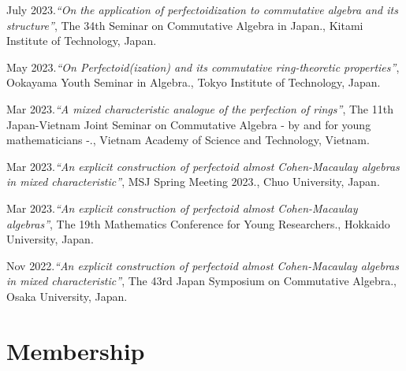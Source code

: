 \documentclass[10pt,a4paper,sans]{moderncv}
\begin{document}
\begin{etaremune}
  \item July 2023.\emph{``On the application of perfectoidization to commutative algebra and its structure''}, \textsf{The 34th Seminar on Commutative Algebra in Japan.}, Kitami Institute of Technology, Japan.
  \item May 2023.\emph{``On Perfectoid(ization) and its commutative ring-theoretic properties''}, \textsf{Ookayama Youth Seminar in Algebra.}, Tokyo Institute of Technology, Japan.
  \item Mar 2023.\emph{``A mixed characteristic analogue of the perfection of rings''}, \textsf{The 11th Japan-Vietnam Joint Seminar on Commutative Algebra - by and for young mathematicians -.}, Vietnam Academy of Science and Technology, Vietnam.
  \item Mar 2023.\emph{``An explicit construction of perfectoid almost Cohen-Macaulay algebras in mixed characteristic''}, \textsf{MSJ Spring Meeting 2023.}, Chuo University, Japan.
  \item Mar 2023.\emph{``An explicit construction of perfectoid almost Cohen-Macaulay algebras''}, \textsf{The 19th Mathematics Conference for Young Researchers.}, Hokkaido University, Japan.
  \item Nov 2022.\emph{``An explicit construction of perfectoid almost Cohen-Macaulay algebras in mixed characteristic''}, \textsf{The 43rd Japan Symposium on Commutative Algebra.}, Osaka University, Japan.
\end{etaremune}


\section{Membership}



\end{document}
